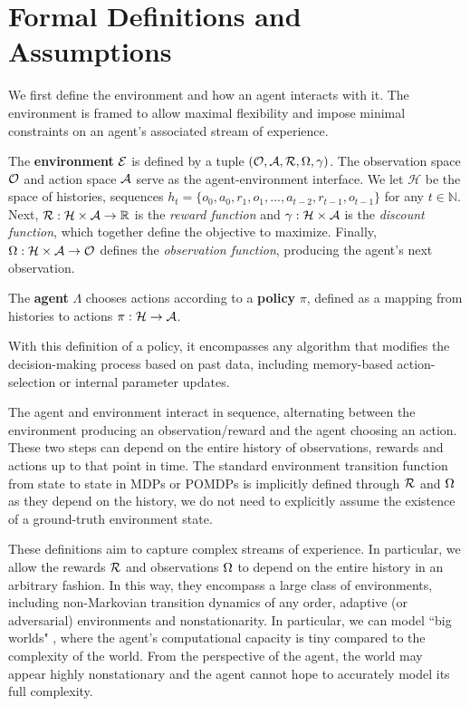 \section{Formal Definitions and Assumptions}

We first define the environment and how an agent interacts with it. The environment is framed to allow maximal flexibility and impose minimal constraints on an agent's associated stream of experience. 


\begin{definition}[Environment] The \textbf{environment} $\mathcal{E}$ is defined by a tuple $(\mathcal{O}, \mathcal{A}, \mathcal{R}, \Omega, \gamma)$. The observation space $\mathcal{O}$ and action space $\mathcal{A}$ serve as the agent-environment interface. We let $\mathcal{H}$ be the space of histories, sequences $h_t =\{o_0, a_0, r_1 , o_1, ..., a_{t-2}, r_{t-1},o_{t-1} \}$ for any $t \in \mathbb{N}$. Next, $\mathcal{R}:  \mathcal{H} \times \mathcal{A} \rightarrow \mathbb{R}$ is the \textit{reward function} and $\gamma : \mathcal{H} \times \mathcal{A}$ is the \textit{discount function}, which together define the objective to maximize. Finally, $\Omega: \mathcal{H} \times \mathcal{A} \rightarrow \mathcal{O}$ defines the \textit{observation function}, producing the agent's next observation. 
\end{definition}


\begin{definition}
    The \textbf{agent} $\Lambda$ chooses actions according to a \textbf{policy} $\pi$, defined as a mapping from histories to actions $\pi : \mathcal{H} \rightarrow \mathcal{A}$.  
\end{definition}
With this definition of a policy, it encompasses any algorithm that modifies the decision-making process based on past data, including memory-based action-selection or internal parameter updates. 

The agent and environment interact in sequence, alternating between the environment producing an observation/reward and the agent choosing an action. These two steps can depend on the entire history of observations, rewards and actions up to that point in time. 
The standard environment transition function from state to state in MDPs or POMDPs is implicitly defined through $\mathcal{R}$ and $\Omega$ as they depend on the history, we do not need to explicitly assume the existence of a ground-truth environment state.

These definitions aim to capture complex streams of experience. In particular, we allow the rewards $\mathcal{R}$ and observations $\Omega$ to depend on the entire history in an arbitrary fashion. 
In this way, they encompass a large class of environments, including non-Markovian transition dynamics of any order, adaptive (or adversarial) environments and nonstationarity. 
In particular, we can model ``big worlds" \citep{javed2025bigworld, lu2021bitbybit}, where the agent's computational capacity is tiny compared to the complexity of the world. From the perspective of the agent, the world may appear highly nonstationary and the agent cannot hope to accurately model its full complexity. 


